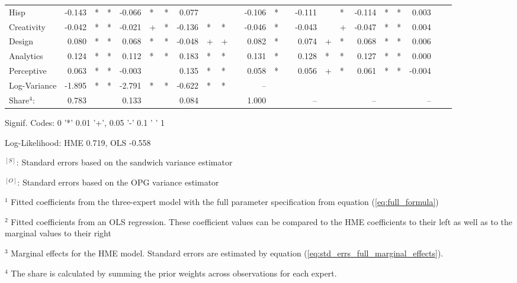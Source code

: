 \documentclass[12pt]{article}
\theoremstyle{definition}
\begin{document}
\begin{landscape}
\begin{table}
\begin{threeparttable}
\begin{tabular}[l]{l r l l r l l r l l c r l c r l l r l l r l l}
    Hisp                  & -0.143 & * & *   & -0.066 & * & *   &  0.077 &   &     && -0.106 & *     && -0.111 &   & *      & -0.114 & * & *     &  0.003 &  \\
    Creativity            & -0.042 & * & *   & -0.021 & + & *   & -0.136 & * & *   && -0.046 & *     && -0.043 &   & +     & -0.047 & * & *     &  0.004 &  \\
    Design                &  0.080 & * & *   &  0.068 & * & *   & -0.048 & + & +   &&  0.082 & *     &&  0.074 & + & *     &  0.068 & * & *     &  0.006 &  \\
    Analytics             &  0.124 & * & *   &  0.112 & * & *   &  0.183 & * & *   &&  0.131 & *     &&  0.128 & * & *     &  0.127 & * & *     &  0.000 &  \\
    Perceptive            &  0.063 & * & *   & -0.003 &   &     &  0.135 & * & *   &&  0.058 & *     &&  0.056 & + & *     &  0.061 & * & *     & -0.004 &  \\
    Log-Variance          & -1.895 & * & *   & -2.791 & * & *   & -0.622 & * & *   &&  --    &       &&        &   &       &        &   &       &        &  \\
    \cmidrule(l){2-4} \cmidrule(l){5-7} \cmidrule(l){8-10} \cmidrule(l){12-13} \cmidrule(l){15-17} \cmidrule(l){18-20} \cmidrule(l){21-23}
    Share$^{4}$:          & 0.783  &   &     & 0.133  &   &     & 0.084  &   &     &&  1.000 &       &&  --    &   &       &  --    &   &       &  --    &  \\
    \cmidrule{1-17}
          \end{tabular}
    
          \begin{tablenotes}
            \item Signif. Codes: 0 '*' 0.01 '+', 0.05 '-' 0.1 ' ' 1
            \item Log-Likelihood: HME 0.719, OLS -0.558
            \item $^{[S]}$: Standard errors based on the sandwich variance estimator
            \item $^{[O]}$: Standard errors based on the OPG variance estimator
            \item $^{1}$ Fitted coefficients from the three-expert model with the full parameter specification from equation (\ref{eq:full_formula})
            \item $^{2}$ Fitted coefficients from an OLS regression. These coefficient values can be compared to the HME coefficients to their left as well as to the marginal values to their right
            \item $^{3}$ Marginal effects for the HME model. Standard errors are estimated by equation (\ref{eq:std_errs_full_marginal_effects}).
            \item $^{4}$ The share is calculated by summing the prior weights across observations for each expert.
    

\end{tablenotes}
\end{threeparttable}
\end{table}
\end{landscape}
\end{document}

